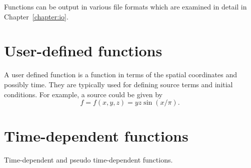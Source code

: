 Functions can be output in various file formats which are examined in detail in
Chapter~\ref{chapter:io}.


\section{User-defined functions}
%
A user defined function is a function in terms of the spatial coordinates and
possibly time. They are typically used for defining source terms and initial
conditions. For example, a source could be given by
\begin{equation}
  f = f(x,y,z) = yz \sin(x / \pi).
\end{equation}


\section{Time-dependent functions}
Time-dependent and pseudo time-dependent functions.

